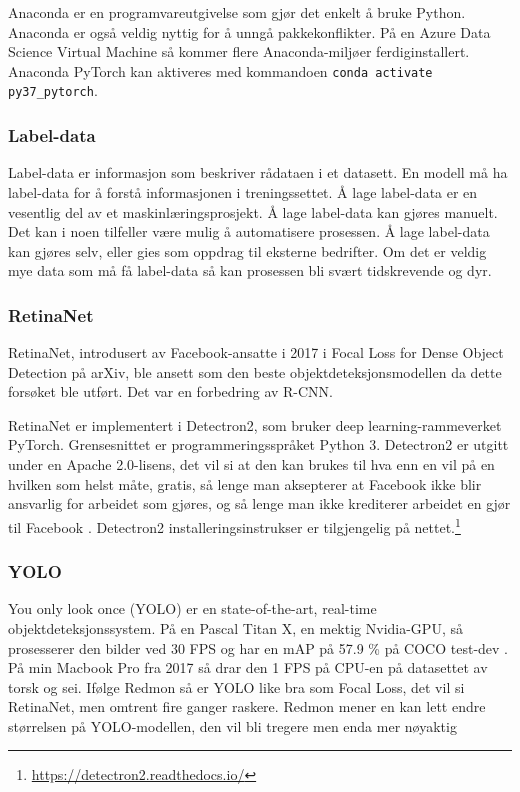 Anaconda er en programvareutgivelse som gjør det enkelt å bruke Python. Anaconda er også veldig nyttig for å unngå pakkekonflikter. På en Azure Data Science Virtual Machine så kommer flere Anaconda-miljøer ferdiginstallert. Anaconda PyTorch kan aktiveres med kommandoen \texttt{conda activate py37\_pytorch}. \cite{Mallick m.fl. 2020} %

\subsubsection{Label-data}

Label-data er informasjon som beskriver rådataen i et datasett. En modell må ha label-data for å forstå informasjonen i treningssettet. Å lage label-data er en vesentlig del av et maskinlæringsprosjekt. Å lage label-data kan gjøres manuelt. Det kan i noen tilfeller være mulig å automatisere prosessen. Å lage label-data kan gjøres selv, eller gies som oppdrag til eksterne bedrifter. Om det er veldig mye data som må få label-data så kan prosessen bli svært tidskrevende og dyr. \cite{Kaller 2019}


\subsubsection{RetinaNet}

RetinaNet, introdusert av Facebook-ansatte i 2017 i Focal Loss for Dense Object Detection på arXiv, ble ansett som den beste objektdeteksjonsmodellen da dette forsøket ble utført. Det var en forbedring av R-CNN. \cite{Lin m.fl. 2017}

RetinaNet er implementert i Detectron2, som bruker deep learning-rammeverket PyTorch. Grensesnittet er programmeringsspråket Python 3. Detectron2 er utgitt under en Apache 2.0-lisens, det vil si at den kan brukes til hva enn en vil på en hvilken som helst måte, gratis, så lenge man aksepterer at Facebook ikke blir ansvarlig for arbeidet som gjøres, og så lenge man ikke krediterer arbeidet en gjør til Facebook \cite{The Apache Software Foundation 2004}. Detectron2 installeringsinstrukser er tilgjengelig på nettet.\footnote{\url{https://detectron2.readthedocs.io/}}

\subsubsection{YOLO}

You only look once (YOLO) er en state-of-the-art, real-time objektdeteksjonssystem. På en Pascal Titan X, en mektig Nvidia-GPU, så prosesserer den bilder ved 30 FPS og har en mAP på 57.9 \% på COCO test-dev \cite{Redmon 2018}. På min Macbook Pro fra 2017 så drar den 1 FPS på CPU-en på datasettet av torsk og sei. Ifølge Redmon så er YOLO like bra som Focal Loss, det vil si RetinaNet, men omtrent fire ganger raskere. Redmon mener en kan lett endre størrelsen på YOLO-modellen, den vil bli tregere men enda mer nøyaktig \cite{Redmon 2016}%

